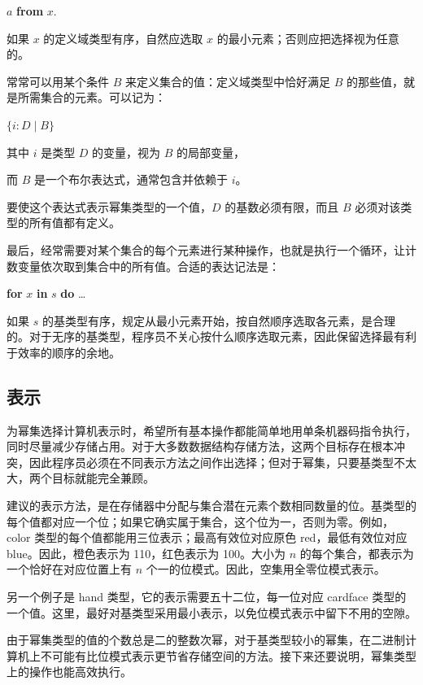\quad $a$ \textbf{from} $x$.

\noindent
如果 $x$ 的定义域类型有序，自然应选取 $x$ 的最小元素；否则应把选择视为任意的。

常常可以用某个条件 $B$ 来定义集合的值：定义域类型中恰好满足 $B$ 的那些值，就是所需集合的元素。可以记为：

\quad $\{i:D \mid B\}$

\noindent
其中 \tabto*{4em} $i$ 是类型 $D$ 的变量，视为 $B$ 的局部变量，

\noindent
而 \tabto*{4em} $B$ 是一个布尔表达式，通常包含并依赖于 $i$。

\noindent
要使这个表达式表示幂集类型的一个值，$D$ 的基数必须有限，而且 $B$ 必须对该类型的所有值都有定义。

最后，经常需要对某个集合的每个元素进行某种操作，也就是执行一个循环，让计数变量依次取到集合中的所有值。合适的表达记法是：

\quad \textbf{for} $x$ \textbf{in} $s$ \textbf{do} \dots

\noindent
如果 $s$ 的基类型有序，规定从最小元素开始，按自然顺序选取各元素，是合理的。对于无序的基类型，程序员不关心按什么顺序选取元素，因此保留选择最有利于效率的顺序的余地。

\subsection{表示}

为幂集选择计算机表示时，希望所有基本操作都能简单地用单条机器码指令执行，同时尽量减少存储占用。对于大多数数据结构存储方法，这两个目标存在根本冲突，因此程序员必须在不同表示方法之间作出选择；但对于幂集，只要基类型不太大，两个目标就能完全兼顾。

建议的表示方法，是在存储器中分配与集合潜在元素个数相同数量的位。基类型的每个值都对应一个位；如果它确实属于集合，这个位为一，否则为零。例如，color 类型的每个值都能用三位表示；最高有效位对应原色 red，最低有效位对应 blue。因此，橙色表示为 110，红色表示为 100。大小为 $n$ 的每个集合，都表示为一个恰好在对应位置上有 $n$ 个一的位模式。因此，空集用全零位模式表示。

另一个例子是 hand 类型，它的表示需要五十二位，每一位对应 cardface 类型的一个值。这里，最好对基类型采用最小表示，以免位模式表示中留下不用的空隙。

由于幂集类型的值的个数总是二的整数次幂，对于基类型较小的幂集，在二进制计算机上不可能有比位模式表示更节省存储空间的方法。接下来还要说明，幂集类型上的操作也能高效执行。

